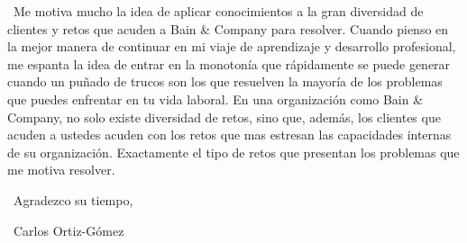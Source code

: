 \documentclass{crortiz_cv_2021}
\begin{document}
{\vspace{5mm} %
\indent \ Me motiva mucho la idea de aplicar conocimientos a la gran diversidad de clientes y retos que acuden a Bain \& Company para resolver. Cuando pienso en la mejor manera de continuar en mi viaje de aprendizaje y desarrollo profesional, me espanta la idea de entrar en la monotonía que rápidamente se puede generar cuando un puñado de trucos son los que resuelven la mayoría de los problemas que puedes enfrentar en tu vida laboral. En una organización como Bain \& Company, no solo existe diversidad de retos, sino que, además, los clientes que acuden a ustedes acuden con los retos que mas estresan las capacidades internas de su organización. Exactamente el tipo de retos que presentan los problemas que me motiva resolver.

\vspace{5mm} %
\ Agradezco su tiempo,

\vspace{5mm} %
\ Carlos Ortiz-Gómez}

\createfootnote
\end{document}
